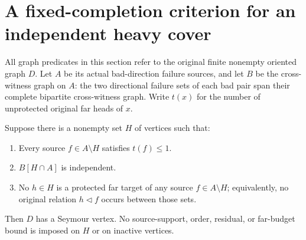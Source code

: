 \section{A fixed-completion criterion for an independent heavy cover}
\label{sec:protected-heavy-cover-criterion}

All graph predicates in this section refer to the original finite
nonempty oriented graph $D$. Let $A$ be its actual bad-direction
failure sources, and let $B$ be the cross-witness graph on $A$:
the two directional failure sets of each bad pair span their complete
bipartite cross-witness graph. Write $t(x)$ for the number of
unprotected original far heads of $x$.

\begin{theorem}
\label{thm:protected-independent-heavy-cover}
Suppose there is a nonempty set $H$ of vertices such that:
\begin{enumerate}
\item Every source $f\in A\setminus H$ satisfies $t(f)\le1$.
\item $B[H\cap A]$ is independent.
\item No $h\in H$ is a protected far target of any source
$f\in A\setminus H$; equivalently, no original relation
$h\triangleleft f$ occurs between those sets.
\end{enumerate}
Then $D$ has a Seymour vertex. No source-support, order, residual, or
far-budget bound is imposed on $H$ or on inactive vertices.
\end{theorem}
